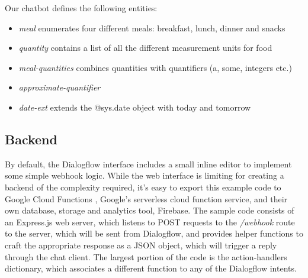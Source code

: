 Our chatbot defines the following entities:
\begin{itemize}
  \item \textit{meal} enumerates four different meals: breakfast, lunch, dinner and snacks
  \item \textit{quantity} contains a list of all the different measurement units for food
  \item \textit{meal-quantities} combines quantities with quantifiers (a, some, integers etc.)
  \item \textit{approximate-quantifier}
  \item \textit{date-ext} extends the @sys.date object with today and tomorrow
\end{itemize}

\subsection{Backend}
By default, the Dialogflow interface includes a small inline editor to implement some simple webhook logic. While the web interface is limiting for creating a backend of the complexity required, it's easy to export this example code to Google Cloud Functions \cite{gcfwebsite}, Google's serverless cloud function service, and their own database, storage and analytics tool, Firebase. 
The sample code consists of an Express.js \cite{expresswebsite} web server, which listens to POST requests to the \textit{/webhook} route to the server, which will be sent from Dialogflow, and provides helper functions to craft the appropriate response as a JSON object, which will trigger a reply through the chat client. The largest portion of the code is the action-handlers dictionary, which associates a different function to any of the Dialogflow intents. \\

